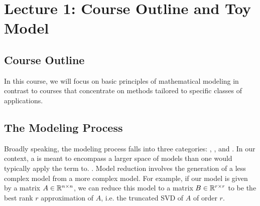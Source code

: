 %
%
%
\chapter{Lecture 1: Course Outline and Toy Model}
\date{January 19, 2022}
\label{intro} %



\section{Course Outline}
\label{sec:1}
In this course, we will focus on basic principles of mathematical modeling in contrast to courses that concentrate on methods tailored to specific classes of applications. 

\section{The Modeling Process}
Broadly speaking, the modeling process falls into three categories: , , and . In our context, a  is meant to encompass a larger space of models than one would typically apply the term  to. . Model reduction involves the generation of a less complex model from a more complex model. For example, if our model is given by a matrix $A \in \mathbb{R}^{n\times n}$, we can reduce this model to a matrix $B \in \mathbb{R}^{r \times r}$ to be the best rank $r$ approximation of $A$, i.e. the truncated SVD of $A$ of order $r$. 

